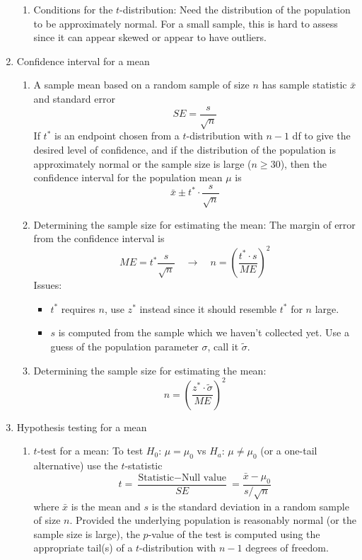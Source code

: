 \documentclass{article}
\begin{document}
\begin{enumerate}
\begin{enumerate}
\item Conditions for the $t$-distribution: Need the distribution of the population to be approximately normal. For a small sample, this is hard to assess since it can appear skewed or appear to have outliers.

\end{enumerate}

\item Confidence interval for a mean
\begin{enumerate}
\item A sample mean based on a random sample of size $n$ has sample statistic $\bar{x}$ and standard error 
\[
SE = \frac{s}{\sqrt{n}}
\]
If $t^*$ is an endpoint chosen from a $t$-distribution with $n-1$ df to give the desired level of confidence, and if the distribution of the population is approximately normal or the sample size is large ($n \geq 30$), then the confidence interval for the population mean $\mu$ is
\[
\bar{x} \pm t^* \cdot \frac{s}{\sqrt{n}}
\]
\item Determining the sample size for estimating the mean: The margin of error from the confidence interval is
\[
ME = t^* \frac{s}{\sqrt{n}} \quad \rightarrow \quad n = \left( \frac{t^* \cdot s}{ME} \right)^2
\]
Issues: 
\begin{itemize}
\item $t^*$ requires $n$, use $z^*$ instead since it should resemble $t^*$ for $n$ large.
\item $s$ is computed from the sample which we haven't collected yet. Use a guess of the population parameter $\sigma$, call it $\tilde{\sigma}$.
\end{itemize}
\item Determining the sample size for estimating the mean:
\[
n = \left( \frac{z^* \cdot \tilde{\sigma}}{ME} \right)^2
\]
\end{enumerate}

\item Hypothesis testing for a mean
\begin{enumerate}
\item $t$-test for a mean: To test $H_0$: $\mu = \mu_0$ vs  $H_a$: $\mu \neq \mu_0$ (or a one-tail alternative) use the $t$-statistic
\[
t = \frac{\text{Statistic} - \text{Null value}}{SE} = \frac{\bar{x}-\mu_0}{s/\sqrt{n}}
\] 
where $\bar{x}$ is the mean and $s$ is the standard deviation in a random sample of size $n$. Provided the underlying population is reasonably normal (or the sample size is large), the $p$-value of the test is computed using the appropriate tail(s) of a $t$-distribution with $n-1$ degrees of freedom.
\end{enumerate}

\end{enumerate}
\end{document}
